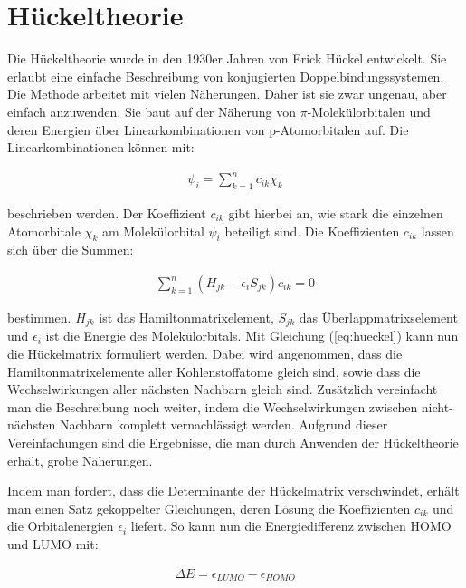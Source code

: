 \section{Hückeltheorie}

Die Hückeltheorie wurde in den 1930er Jahren von Erick Hückel entwickelt. \cite{Reinhold} Sie erlaubt eine einfache Beschreibung von konjugierten Doppelbindungssystemen. Die Methode arbeitet mit vielen Näherungen. Daher ist sie zwar ungenau, aber einfach anzuwenden. Sie baut auf der Näherung von $\pi$-Molekülorbitalen und deren Energien über Linearkombinationen von p-Atomorbitalen auf. Die Linearkombinationen können mit:

\begin{align}
 \psi_{i} = \sum \limits_{k=1}^n c_{ik} \chi_k 
\end{align}

beschrieben werden. Der Koeffizient $c_{ik}$ gibt hierbei an, wie  stark die einzelnen Atomorbitale $\chi_k$ am Molekülorbital $\psi_i$ beteiligt sind. Die Koeffizienten $c_{ik}$ lassen sich über die Summen:

\begin{align}\label{eq:hueckel}
  \sum \limits_{k=1}^n (H_{jk}-\epsilon_i S_{jk}) c_{ik} = 0
\end{align}

bestimmen. $H_{jk}$ ist das Hamiltonmatrixelement, $S_{jk}$ das Überlappmatrixselement und $\epsilon_i$ ist die Energie des Molekülorbitals. Mit Gleichung (\ref{eq:hueckel}) kann nun die Hückelmatrix formuliert werden. Dabei wird angenommen, dass die Hamiltonmatrixelemente aller Kohlenstoffatome gleich sind, sowie dass die Wechselwirkungen aller nächsten Nachbarn gleich sind. Zusätzlich vereinfacht man die Beschreibung noch weiter, indem die Wechselwirkungen zwischen nicht-nächsten Nachbarn komplett vernachlässigt werden. Aufgrund dieser Vereinfachungen sind die Ergebnisse, die man durch Anwenden der Hückeltheorie erhält, grobe Näherungen.


Indem man fordert, dass die Determinante der Hückelmatrix verschwindet, erhält man einen Satz gekoppelter Gleichungen, deren Lösung die Koeffizienten $c_{ik}$ und die Orbitalenergien $\epsilon_i$ liefert. So kann nun die Energiedifferenz zwischen HOMO und LUMO mit:

\begin{align}
  \Delta E = \epsilon_{LUMO} - \epsilon_{HOMO}
\end{align}

